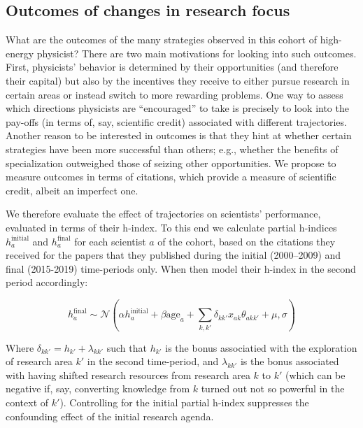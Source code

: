 \documentclass{article}
\begin{document}



\subsection{\label{sec:outcomes}Outcomes of changes in research focus}

What are the outcomes of the many strategies observed in this cohort of high-energy physicist? There are two main motivations for looking into such outcomes. First, physicists' behavior is determined by their opportunities (and therefore their capital) but also by the incentives they receive to either pursue research in certain areas or instead switch to more rewarding problems. One way to assess which directions physicists are ``encouraged'' to take is precisely to look into the pay-offs (in terms of, say, scientific credit) associated with different trajectories. Another reason to be interested in outcomes is that they hint at whether certain strategies have been more successful than others; e.g., whether the benefits of specialization outweighed those of seizing other opportunities. We propose to measure outcomes in terms of citations, which provide a measure of scientific credit, albeit an imperfect one. 

We therefore evaluate the effect of trajectories on scientists' performance, evaluated in terms of their h-index. To this end we calculate partial h-indices $h_a^{\text{initial}}$ and $h_a^{\text{final}}$ for each scientist $a$ of the cohort, based on the citations they received for the papers that they published during the initial (2000--2009) and final (2015-2019) time-periods only.  When then model their h-index in the second period accordingly:

\begin{equation}
    h_a^{\text{final}} \sim \mathcal{N}(\alpha h_a^{\text{initial}} + \beta \text{age}_a + \sum_{k,k'}\delta_{kk'}x_{ak}\theta_{akk'}+\mu,\sigma)
\end{equation}

Where $\delta_{kk'} = h_{k'} + \lambda_{kk'}$ such that $h_{k'}$ is the bonus associatied with the exploration of research area $k'$ in the second time-period, and $\lambda_{kk'}$ is the bonus associated with having shifted research resources from research area $k$ to $k'$ (which can be negative if, say, converting knowledge from $k$ turned out not so powerful in the context of $k'$). Controlling for the initial partial h-index suppresses the confounding effect of the initial research agenda.
\end{document}

